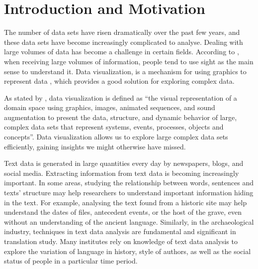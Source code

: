 

\section{Introduction and Motivation}

The number of data sets have risen dramatically over the past few years, and these data sets have become increasingly complicated to analyse.  Dealing with large volumes of data has become a challenge in certain fields\cite{Larameea}. According to \cite{Ward2015}, when receiving large volumes of information, people tend to use sight as the main sense to understand it. Data visualization, is a mechanism for using graphics to represent data \cite{Ward2015}, which provides a good solution for exploring complex data.

As stated by \cite{Williams1995}, data visualization is defined as “the visual representation of a domain space using graphics, images, animated sequences, and sound augmentation to present the data, structure, and dynamic behavior of large, complex data sets that represent systems, events, processes, objects and concepts”\cite{Williams1995}. Data visualization allows us to explore large complex data sets efficiently, gaining insights we might otherwise have missed.

Text data is generated in large quantities every day by newspapers, blogs, and social media. Extracting information from text data is becoming increasingly important. In some areas, studying the relationship between words, sentences and texts’ structure may help researchers to understand important information hiding in the text. For example, analysing the text found from a historic site may help understand the dates of files, antecedent events, or the host of the grave, even without an understanding of the ancient language. Similarly, in the archaeological industry, techniques in text data analysis are fundamental and significant in translation study. Many institutes rely on knowledge of text data analysis to explore the variation of language in history, style of authors, as well as the social status of people in a particular time period.

